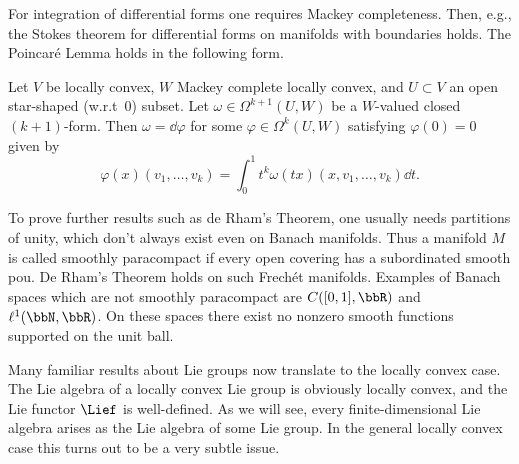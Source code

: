 For integration of differential forms one requires Mackey completeness. Then, e.g., the Stokes theorem for differential forms on manifolds with boundaries holds. The Poincar\'e Lemma holds in the following form.

\begin{lem}
    Let $V$ be locally convex, $W$ Mackey complete locally convex, and $U\subset V$ an open star-shaped (w.r.t\ $0$) subset. Let $\omega\in \Omega^{k+1}(U,W)$ be a $W$-valued closed $(k+1)$-form. Then $\omega=\dd \varphi$ for some $\varphi\in \Omega^k(U,W)$ satisfying $\varphi(0)=0$ given by
    \[\varphi(x)(v_1,\ldots,v_k)=\int_0^1 t^k\omega(tx)(x,v_1,\ldots,v_k)\dd t.\]
\end{lem}

To prove further results such as de Rham's Theorem, one usually needs partitions of unity, which don't always exist even on Banach manifolds. Thus a manifold $M$ is called smoothly paracompact if every open covering has a subordinated smooth \gls{pou}. De Rham's Theorem holds on such Frech\'et manifolds. Examples of Banach spaces which are not smoothly paracompact are $C([0,1],\bbR)$ and $\ell^1(\bbN,\bbR)$. On these spaces there exist no nonzero smooth functions supported on the unit ball.


Many familiar results about Lie groups now translate to the locally convex case. The Lie algebra of a locally convex Lie group is obviously locally convex, and the Lie functor $\Lief$ is well-defined. As we will see, every finite-dimensional Lie algebra arises as the Lie algebra of some Lie group. In the general locally convex case this turns out to be a very subtle issue.

